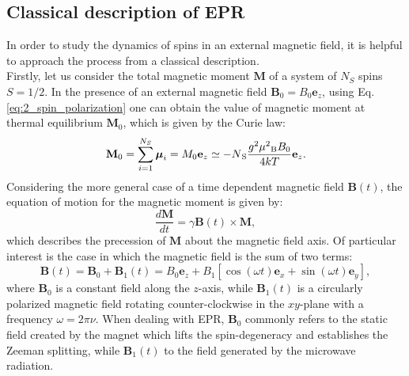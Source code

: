 \documentclass[a4paper]{book}
\newcommand{\tsub}{\textsubscript}
\newcommand{\mb}{\mathbf}
\newcommand{\mbe}{\mathbf{e}}
\begin{document}
	\subsection{Classical description of EPR}
	\label{sec:2_classical_description}
	In order to study the dynamics of spins in an external magnetic field, it is helpful to approach the process from a classical description. 
	\\
	Firstly, let us consider the total magnetic moment $\mb M$ of a system of $N_S$ spins $S = 1/2$. In the presence of an external magnetic field $\textbf{B}_0 = B_0\mbe_z$, using Eq. \eqref{eq:2_spin_polarization} one can obtain the value of magnetic moment at thermal equilibrium $\mb M_0$, which is given by the Curie law:
	\begin{equation}
		\label{eq:2_Curie_law}
		\mb{M}_0 = 
		\sum^{N_S}_{i = 1} \boldsymbol \mu_i =
		M_0\textbf{e}_z \simeq		
		-N\tsub S\frac{g^2\mu^2\tsub B B_0}{4kT}\mbe_z.
	\end{equation}
	Considering the more general case of a time dependent magnetic field $\mb{B}(t)$, the equation of motion for the magnetic moment is given by:
	\begin{equation}
		\label{eq:2_eq_motion_M}
		\frac{d\mb{M}}{dt} = 
		\gamma\mb{B}(t)\times\mb{M},
	\end{equation}
	which describes the precession of $\mb{M}$ about the magnetic field axis. Of particular interest is the case in which the magnetic field is the sum of two terms:
	\begin{equation}
		\mb{B}(t) = \mb{B}_0 + \mb{B}_1(t) = B_0 \textbf{e}_z + B_1[\cos(\omega t)\mbe_x + \sin(\omega t)\mbe_y],
		\label{eq:2_B_B0_B1t}
	\end{equation}
	where $\mb B_0$ is a constant field along the $z$-axis, while $\mb B_1(t)$ is a circularly polarized magnetic field rotating counter-clockwise in the $xy$-plane with a frequency $\omega = 2\pi\nu$. When dealing with EPR, $\mb B_0$ commonly refers to the static field created by the magnet which lifts the spin-degeneracy and establishes the Zeeman splitting, while $\textbf{B}_1(t)$ to the field generated by the microwave radiation.\\
\end{document}
